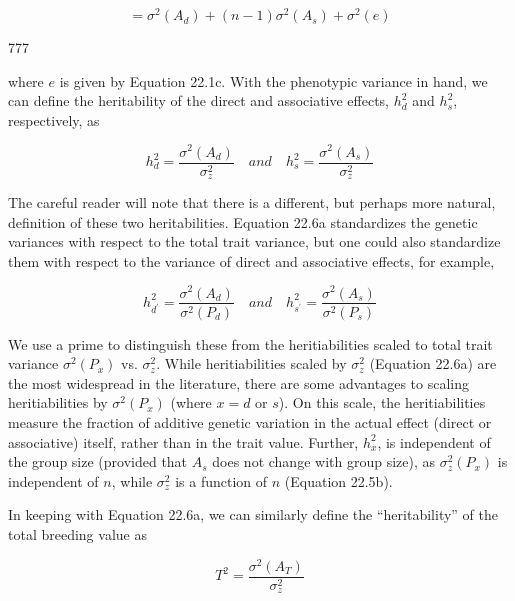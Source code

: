 \documentclass{article}
\begin{document}
\begin{equation}
=\sigma^{2}(A_{d})+(n-1)\sigma^{2}(A_{s})+\sigma^{2}(e)
\tag{22.5d}
\label{eq:22_5d}
\end{equation}

777

where  $ e $ is given by Equation 22.1c. With the phenotypic variance in hand, we can define the heritability of the direct and associative effects,  $ h_d^2 $ and  $ h_s^2 $, respectively, as

\begin{equation}
h_{d}^{2}=\frac{\sigma^{2}(A_{d})}{\sigma_{z}^{2}}\quad and\quad h_{s}^{2}=\frac{\sigma^{2}(A_{s})}{\sigma_{z}^{2}}
\tag{22.6a}
\label{eq:22_6a}
\end{equation}

The careful reader will note that there is a different, but perhaps more natural, definition of these two heritabilities. Equation 22.6a standardizes the genetic variances with respect to the total trait variance, but one could also standardize them with respect to the variance of direct and associative effects, for example,

\begin{equation}
h_{d^{\prime}}^{2}=\frac{\sigma^{2}(A_{d})}{\sigma^{2}(P_{d})}\quad and\quad h_{s^{\prime}}^{2}=\frac{\sigma^{2}(A_{s})}{\sigma^{2}(P_{s})}
\tag{22.6b}
\label{eq:22_6b}
\end{equation}

We use a prime to distinguish these from the heritiabilities scaled to total trait variance  $ \sigma^2(P_x) $ vs.  $ \sigma_z^2 $. While heritiabilities scaled by  $ \sigma_z^2 $ (Equation 22.6a) are the most widespread in the literature, there are some advantages to scaling heritiabilities by  $ \sigma^2(P_x) $ (where  $ x = d $ or  $ s $). On this scale, the heritiabilities measure the fraction of additive genetic variation in the actual effect (direct or associative) itself, rather than in the trait value. Further,  $ h_x^2 $, is independent of the group size (provided that  $ A_s $ does not change with group size), as  $ \sigma_z^2(P_x) $ is independent of  $ n $, while  $ \sigma_z^2 $ is a function of  $ n $ (Equation 22.5b).

In keeping with Equation 22.6a, we can similarly define the “heritability” of the total breeding value as

\begin{equation}
T^{2}=\frac{\sigma^{2}(A_{T})}{\sigma_{z}^{2}}
\tag{22.7a}
\label{eq:22_7a}
\end{equation}
\end{document}
